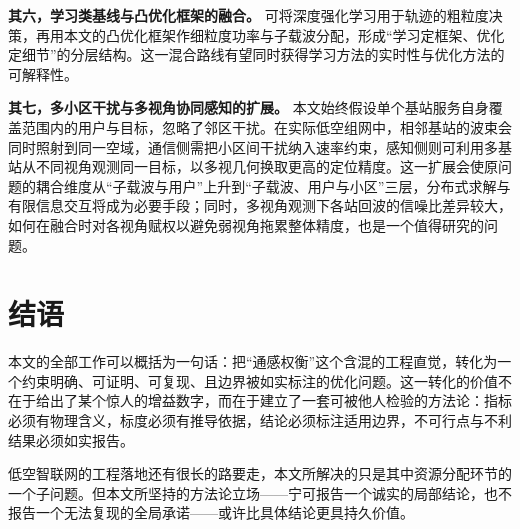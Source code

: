 \textbf{其六，学习类基线与凸优化框架的融合。} 可将深度强化学习用于轨迹的粗粒度决策，再用本文的凸优化框架作细粒度功率与子载波分配，形成“学习定框架、优化定细节”的分层结构。这一混合路线有望同时获得学习方法的实时性与优化方法的可解释性。

\textbf{其七，多小区干扰与多视角协同感知的扩展。} 本文始终假设单个基站服务自身覆盖范围内的用户与目标，忽略了邻区干扰。在实际低空组网中，相邻基站的波束会同时照射到同一空域，通信侧需把小区间干扰纳入速率约束，感知侧则可利用多基站从不同视角观测同一目标，以多视几何换取更高的定位精度。这一扩展会使原问题的耦合维度从“子载波与用户”上升到“子载波、用户与小区”三层，分布式求解与有限信息交互将成为必要手段；同时，多视角观测下各站回波的信噪比差异较大，如何在融合时对各视角赋权以避免弱视角拖累整体精度，也是一个值得研究的问题。

\section{结语}
\label{sec:closing}

本文的全部工作可以概括为一句话：把“通感权衡”这个含混的工程直觉，转化为一个约束明确、可证明、可复现、且边界被如实标注的优化问题。这一转化的价值不在于给出了某个惊人的增益数字，而在于建立了一套可被他人检验的方法论：指标必须有物理含义，标度必须有推导依据，结论必须标注适用边界，不可行点与不利结果必须如实报告。

低空智联网的工程落地还有很长的路要走，本文所解决的只是其中资源分配环节的一个子问题。但本文所坚持的方法论立场——宁可报告一个诚实的局部结论，也不报告一个无法复现的全局承诺——或许比具体结论更具持久价值。

